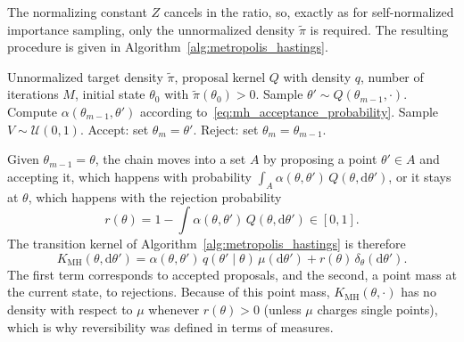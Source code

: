 The normalizing constant $Z$ cancels in the ratio, so, exactly as for self-normalized importance sampling, only the unnormalized density $\tilde{\pi}$ is required. The resulting procedure is given in Algorithm~\ref{alg:metropolis_hastings}.

\begin{algorithm}[H]
\caption{Metropolis-Hastings}
\label{alg:metropolis_hastings}
\begin{algorithmic}[1]
    \REQUIRE Unnormalized target density $\tilde{\pi}$, proposal kernel $Q$ with density $q$, number of iterations $M$, initial state $\theta_0$ with $\tilde{\pi}(\theta_0)>0$.
        \STATE Sample $\theta'\sim Q(\theta_{m-1},\cdot)$.
        \STATE Compute $\alpha(\theta_{m-1},\theta')$ according to~\eqref{eq:mh_acceptance_probability}.
        \STATE Sample $V\sim\mathcal{U}(0,1)$.
            \STATE Accept: set $\theta_m = \theta'$.
        \ELSE
            \STATE Reject: set $\theta_m = \theta_{m-1}$.
        \ENDIF
    \ENDFOR
\end{algorithmic}
\end{algorithm}

Given $\theta_{m-1} = \theta$, the chain moves into a set $A$ by proposing a point $\theta'\in A$ and accepting it, which happens with probability $\int_A\alpha(\theta,\theta')\,Q(\theta,\mathrm{d}\theta')$, or it stays at $\theta$, which happens with the rejection probability
\begin{equation}
    r(\theta) = 1-\int\alpha(\theta,\theta')\,Q(\theta,\mathrm{d}\theta')\in[0,1].
\end{equation}
The transition kernel of Algorithm~\ref{alg:metropolis_hastings} is therefore
\begin{equation}
    K_{\mathrm{MH}}(\theta,\mathrm{d}\theta') = \alpha(\theta,\theta')\,q(\theta'\mid\theta)\,\mu(\mathrm{d}\theta') + r(\theta)\,\delta_\theta(\mathrm{d}\theta').
    \label{eq:mh_kernel}
\end{equation}
The first term corresponds to accepted proposals, and the second, a point mass at the current state, to rejections. Because of this point mass, $K_{\mathrm{MH}}(\theta,\cdot)$ has no density with respect to $\mu$ whenever $r(\theta)>0$ (unless $\mu$ charges single points), which is why reversibility was defined in terms of measures.

